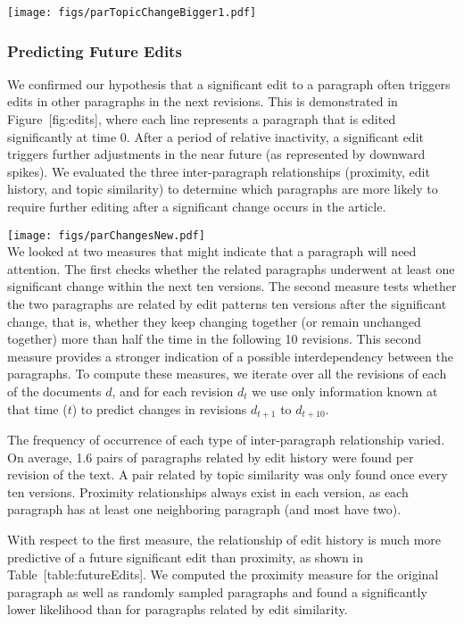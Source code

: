 \texttt{[image: figs/parTopicChangeBigger1.pdf]}\\

\subsubsection{Predicting Future Edits}\label{predicting-future-edits-1}

We confirmed our hypothesis that a significant edit to a paragraph often
triggers edits in other paragraphs in the next revisions. This is
demonstrated in Figure~{[}fig:edits{]}, where each line represents a
paragraph that is edited significantly at time 0. After a period of
relative inactivity, a significant edit triggers further adjustments in
the near future (as represented by downward spikes). We evaluated the
three inter-paragraph relationships (proximity, edit history, and topic
similarity) to determine which paragraphs are more likely to require
further editing after a significant change occurs in the article.

\texttt{[image: figs/parChangesNew.pdf]}\\

We looked at two measures that might indicate that a paragraph will need
attention. The first checks whether the related paragraphs underwent at
least one significant change within the next ten versions. The second
measure tests whether the two paragraphs are related by edit patterns
ten versions after the significant change, that is, whether they keep
changing together (or remain unchanged together) more than half the time
in the following 10 revisions. This second measure provides a stronger
indication of a possible interdependency between the paragraphs. To
compute these measures, we iterate over all the revisions of each of the
documents \(d\), and for each revision \(d_t\) we use only information
known at that time (\(t\)) to predict changes in revisions \(d_{t+1}\)
to \(d_{t+10}\).

The frequency of occurrence of each type of inter-paragraph relationship
varied. On average, 1.6 pairs of paragraphs related by edit history were
found per revision of the text. A pair related by topic similarity was
only found once every ten versions. Proximity relationships always exist
in each version, as each paragraph has at least one neighboring
paragraph (and most have two).

With respect to the first measure, the relationship of edit history is
much more predictive of a future significant edit than proximity, as
shown in Table~{[}table:futureEdits{]}. We computed the proximity
measure for the original paragraph as well as randomly sampled
paragraphs and found a significantly lower likelihood than for
paragraphs related by edit similarity.

